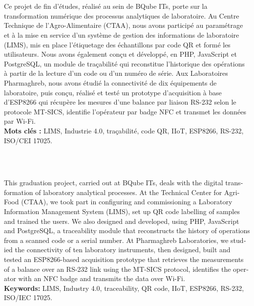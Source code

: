 \thispagestyle{empty}
\pagestyle{empty}

\noindent{\color{bleu}\rule{\textwidth}{0.6pt}}\\[0.2cm]
\\[0.2cm]
Ce projet de fin d'études, réalisé au sein de BQube ITs, porte sur la transformation numérique des processus analytiques de laboratoire. Au Centre Technique de l'Agro-Alimentaire (CTAA), nous avons participé au paramétrage et à la mise en service d'un système de gestion des informations de laboratoire (LIMS), mis en place l'étiquetage des échantillons par code QR et formé les utilisateurs. Nous avons également conçu et développé, en PHP, JavaScript et PostgreSQL, un module de traçabilité qui reconstitue l'historique des opérations à partir de la lecture d'un code ou d'un numéro de série. Aux Laboratoires Pharmaghreb, nous avons étudié la connectivité de dix équipements de laboratoire, puis conçu, réalisé et testé un prototype d'acquisition à base d'ESP8266 qui récupère les mesures d'une balance par liaison RS-232 selon le protocole MT-SICS, identifie l'opérateur par badge NFC et transmet les données par Wi-Fi.\\[0.2cm]
\noindent\textbf{Mots clés :} LIMS, Industrie 4.0, traçabilité, code QR, IIoT, ESP8266, RS-232, ISO/CEI 17025.\\
\noindent{\color{bleu}\rule{\textwidth}{0.6pt}}

\vspace{1.5cm}

\noindent{\color{bleu}\rule{\textwidth}{0.6pt}}\\[0.2cm]
\\[0.2cm]
\begin{otherlanguage}{english}
This graduation project, carried out at BQube ITs, deals with the digital transformation of laboratory analytical processes. At the Technical Center for Agri-Food (CTAA), we took part in configuring and commissioning a Laboratory Information Management System (LIMS), set up QR code labelling of samples and trained the users. We also designed and developed, using PHP, JavaScript and PostgreSQL, a traceability module that reconstructs the history of operations from a scanned code or a serial number. At Pharmaghreb Laboratories, we studied the connectivity of ten laboratory instruments, then designed, built and tested an ESP8266-based acquisition prototype that retrieves the measurements of a balance over an RS-232 link using the MT-SICS protocol, identifies the operator with an NFC badge and transmits the data over Wi-Fi.\\[0.2cm]
\noindent\textbf{Keywords:} LIMS, Industry 4.0, traceability, QR code, IIoT, ESP8266, RS-232, ISO/IEC 17025.
\end{otherlanguage}\\
\noindent{\color{bleu}\rule{\textwidth}{0.6pt}}
